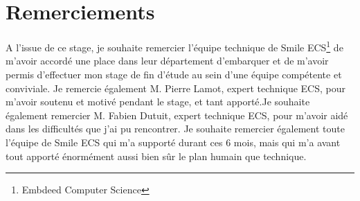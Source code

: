 \chapter*{Remerciements}
  A l'issue de ce stage, je souhaite remercier l'équipe technique de Smile ECS\footnote{Embdeed Computer Science} de m'avoir accordé une place dans leur département d'embarquer et de m'avoir permis d'effectuer mon stage de fin d'étude au sein d'une équipe compétente et conviviale. Je remercie également M. Pierre Lamot, expert technique ECS, pour m'avoir soutenu et motivé pendant le stage, et tant apporté.Je souhaite également remercier M. Fabien Dutuit, expert technique ECS, pour m'avoir
  aidé dans les difficultés que j'ai pu rencontrer. Je souhaite remercier également toute l'équipe de Smile ECS qui m'a supporté durant ces 6 mois, mais qui m'a avant tout apporté énormément aussi bien sûr le plan humain que technique.
